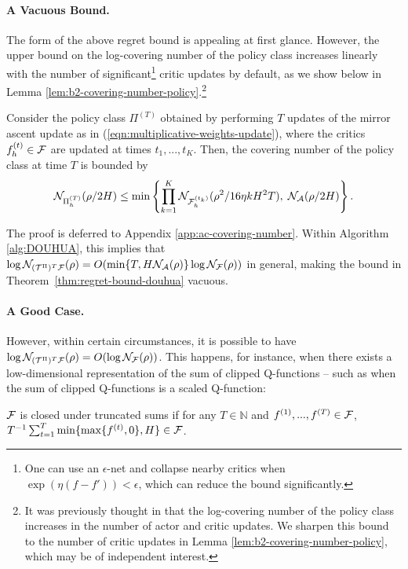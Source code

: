 \paragraph{A Vacuous Bound.} The form of the above regret bound is appealing at first glance. However, the upper bound on the log-covering number of the policy class increases linearly with the number of significant\footnote{One can use an $\epsilon$-net and collapse nearby critics when $\exp(\eta(f-f')) < \epsilon$, which can reduce the bound significantly.} critic updates by default, as we show below in Lemma \ref{lem:b2-covering-number-policy}.\footnote{It was previously thought in \citet{zhong2023theoretical} that the log-covering number of the policy class increases in the number of actor and critic updates. We sharpen this bound to the number of critic updates in Lemma \ref{lem:b2-covering-number-policy}, which may be of independent interest.} 
\begin{lem}
    Consider the policy class $\Pi^{(T)}$ obtained by performing $T$ updates of the mirror ascent update as in (\ref{eqn:multiplicative-weights-update}), 
    where the critics $f_h^{(t)} \in {\mathcal{F}}$ are updated at times $t_1,...,t_K$. Then, the covering number of the policy class at time $T$ is bounded by 
    \begin{align}{\mathcal{N}}_{\Pi_h^{(T)}}(\rho/2H) \leq \min\left\{\prod_{k=1}^{K}{\mathcal{N}}_{{\mathcal{F}}_h^{(t_k)}}(\rho^2/16\eta k H^2 T), \;{\mathcal{N}}_{{\mathcal{A}}}(\rho/2H)\right\}.\end{align}
    \label{lem:b2-covering-number-policy}
\end{lem}
The proof is deferred to Appendix \ref{app:ac-covering-number}. Within Algorithm \ref{alg:DOUHUA}, this implies that $\log {\mathcal{N}}_{({\mathcal{T}}^\Pi)^{T}{\mathcal{F}}}(\rho) = O(\min\{ T , H{\mathcal{N}}_{{\mathcal{A}}}(\rho)\}\log {\mathcal{N}}_{{\mathcal{F}}}(\rho))$ in general, making the bound in Theorem~\ref{thm:regret-bound-douhua} vacuous. 

\paragraph{A Good Case.} However, within certain circumstances, it is possible to have $\log {\mathcal{N}}_{({\mathcal{T}}^\Pi)^{T}{\mathcal{F}}}(\rho) = O(\log {\mathcal{N}}_{{\mathcal{F}}}(\rho))$. This happens, for instance, when there exists a low-dimensional representation of the sum of clipped Q-functions -- such as when the sum of clipped Q-functions is a scaled Q-function:
\begin{defn}
    ${\mathcal{F}}$ is closed under truncated sums if for any $T \in \mathbb{N}$ and $f^{(1)},...,f^{(T)} \in {\mathcal{F}}$, $T^{-1}\sum_{t=1}^T \min\{\max\{f^{(t)},0\},H\} \in {\mathcal{F}}$.
    \label{defn:closure-truncated-sums}
\end{defn}

